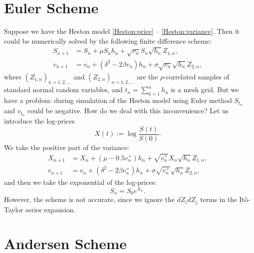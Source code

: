     \section{Euler Scheme}
        Suppose we have the Heston model \eqref{Heston:price} -- \eqref{Heston:variance}. Then it could be numerically 
        solved by the following finite difference scheme:
        \begin{align}
            S_{n+1} & = S_n + \mu S_n h_n + \sqrt{v_n} S_n \sqrt{h_n} Z_{1,n}, \label{Euler:Heston:price}\\
            v_{n+1} & = v_n + \left(\delta^2 - 2\beta v_n\right) h_n + \sigma \sqrt{v_n} \sqrt{h_n} Z_{2,n}, \label{Euler:Heston:variance}
        \end{align}
        where $(Z_{1,n})_{n=1, 2, \dots}$ and $(Z_{2,n})_{n=1, 2, \dots}$ are the $\rho$-correlated samples of standard 
        normal random variables, and $t_n = \sum_{k=1}^n h_n$ is a mesh grid.
        But we have a problem: during simulation of the Heston model using Euler method $S_{t_n}$ and $v_{t_n}$ could be 
        negative. How do we deal with this inconvenience? Let us introduce the log-prices
        \begin{equation}
            X(t) := \log\frac{S(t)}{S(0)}.
        \end{equation}
        We take the positive part of the variance:
        \begin{align}
            X_{n+1} & = X_n + (\mu - 0.5 v_n^+)h_n + \sqrt{v_n^+} X_n \sqrt{h_n} Z_{1,n}, \label{Euler:Heston:price:posmod}\\
            v_{n+1} & = v_n + \left(\delta^2 - 2\beta v_n^+\right) h_n + \sigma \sqrt{v_n^+} \sqrt{h_n} Z_{2,n}, \label{Euler:Heston:variance:posmod}
        \end{align}
        and then we take the exponential of the log-prices:
        \begin{equation}
            S_{n} = S_0 e^{X_{n}}.
        \end{equation}
        However, the scheme is not accurate, since we ignore the $dZ_idZ_j$ terms in the It\^o-Taylor series expansion.

    \section{Andersen Scheme}
